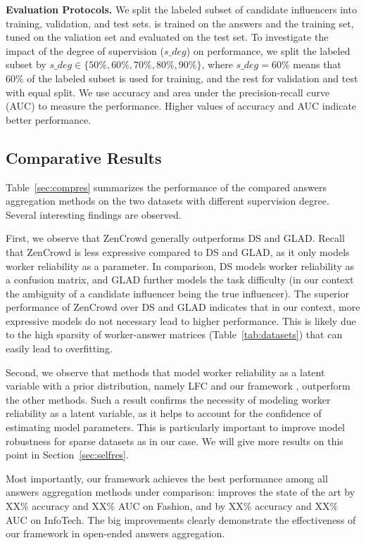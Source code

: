 \smallskip
\noindent\textbf{Evaluation Protocols.} We split the labeled subset of candidate influencers into training, validation, and test sets. \sys is trained on the answers and the training set, tuned on the valiation set and evaluated on the test set. To investigate the impact of the degree of supervision ($s\_deg$) on \sys performance, we split the labeled subset by $s\_deg\in \{50\%, 60\%, 70\%, 80\%, 90\%\}$, where $s\_deg = 60\%$ means that 60\% of the labeled subset is used for training, and the rest for validation and test with equal split. We use accuracy and area under the precision-recall curve (AUC) to measure the performance. Higher values of accuracy and AUC indicate better performance.



\subsection{Comparative Results}
Table~\ref{sec:compres} summarizes the performance of the compared answers aggregation methods on the two datasets with different supervision degree. Several interesting findings are observed.

First, we observe that ZenCrowd generally outperforms DS and GLAD. Recall that ZenCrowd is less expressive compared to DS and GLAD, as it only models worker reliability as a parameter. In comparison, DS models worker reliability as a confusion matrix, and GLAD further models the task difficulty (in our context the ambiguity of a candidate influencer being the true influencer). The superior performance of ZenCrowd  over DS and GLAD indicates that in our context, more expressive models do not necessary lead to higher performance. This is likely due to the high sparsity of worker-answer matrices (Table~\ref{tab:datasets}) that can easily lead to overfitting.

Second, we observe that methods that model worker reliability as a latent variable with a prior distribution, namely LFC and our framework \sys, outperform the other methods. Such a result confirms the necessity of modeling worker reliability as a latent variable, as it helps to account for the confidence of estimating model parameters. This is particularly important to improve model robustness for sparse datasets as in our case. We  will give more results on this point in Section~\ref{sec:selfres}.

Most importantly, our framework \sys achieves the best performance among all answers aggregation methods under comparison: \sys improves the state of the art by  XX\% accuracy and XX\% AUC on Fashion, and by XX\% accuracy and XX\% AUC on InfoTech. The big improvements clearly demonstrate the effectiveness of our framework in open-ended answers aggregation. 



